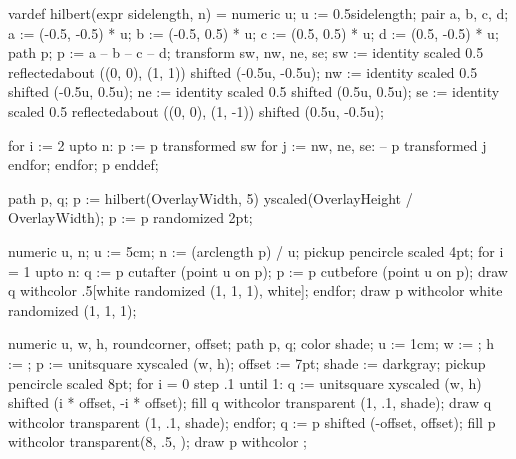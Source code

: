 \setupinteraction[
  title={ConTeXt 蹊径},
  author={李延瑞 (lyr.m2@live.cn)},
  keyword={TeX, ConTeXt MkIV, ConTeXt LMTX, LuaTeX, LuaMetaTeX}
]

\startMPinclusions[+]
vardef hilbert(expr sidelength, n) = 
  numeric u; u := 0.5sidelength;
  pair a, b, c, d;
  a := (-0.5, -0.5) * u;
  b := (-0.5, 0.5) * u;
  c := (0.5, 0.5) * u;
  d := (0.5, -0.5) * u;
  path p; 
  p := a -- b -- c -- d;
  transform sw, nw, ne, se;
  sw := identity
        scaled 0.5
        reflectedabout ((0, 0), (1, 1))
        shifted (-0.5u, -0.5u);
  nw := identity
        scaled 0.5
        shifted (-0.5u, 0.5u);
  ne := identity
        scaled 0.5
        shifted (0.5u, 0.5u);
  se := identity
        scaled 0.5
        reflectedabout ((0, 0), (1, -1))
        shifted (0.5u, -0.5u);

  for i := 2 upto n:
    p := p transformed sw for j := nw, ne, se: -- p transformed j endfor;
  endfor;
  p
enddef;
\stopMPinclusions

path p, q;
p := hilbert(OverlayWidth, 5) yscaled(OverlayHeight / OverlayWidth);
p := p randomized 2pt;

numeric u, n; u := 5cm; n := (arclength p) / u;
pickup pencircle scaled 4pt;
for i = 1 upto n:
  q := p cutafter (point u on p);
  p := p cutbefore (point u on p);
  draw q withcolor .5[white randomized (1, 1, 1), white];
endfor;
draw p withcolor white randomized (1, 1, 1);
\stopuseMPgraphic
{}

numeric u, w, h, roundcorner, offset;
path p, q;
color shade;
u := 1cm; w := \overlaywidth; h := \overlayheight;
p := unitsquare xyscaled (w, h);
offset := 7pt;
shade := darkgray;
pickup pencircle scaled 8pt;
for i = 0 step .1 until 1:
    q := unitsquare xyscaled (w, h) shifted (i * offset, -i * offset);
    fill q withcolor transparent (1, .1, shade);
    draw q withcolor transparent (1, .1, shade);
endfor;
q := p shifted (-offset, offset);
fill p withcolor transparent(8, .5, );
draw p withcolor ;
\stopuniqueMPgraphic
{}

\setupbackgrounds[page][background=TitleGraphic]
\startstandardmakeup
\hfil
  \startcolor[yellow]
  \stopcolor
  \hfil
  \blank[14cm]
\stopstandardmakeup
\setupbackgrounds[page][background=]

